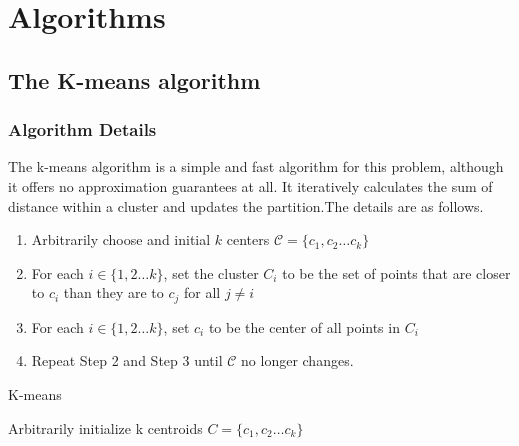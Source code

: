 \documentclass[11pt]{article}
\begin{document}
\section{Algorithms}
\subsection{The K-means algorithm}
\subsubsection{Algorithm Details}
The k-means algorithm is a simple and fast algorithm for this problem, although it offers no approximation guarantees at all.
It iteratively calculates the sum of distance within a cluster and updates the partition.The details are as follows.\cite{k-means}
\begin{enumerate}
  \item Arbitrarily choose and initial $k$ centers $\mathcal{C} = \{c_1, c_2 \dots c_k\}$
  \item For each $i \in \{1, 2 \dots k\}$, set the cluster $C_i$ to be the set of points that are closer to $c_i$ than they are to $c_j$ for all $j \neq i$
  \item For each $i \in \{1, 2 \dots k\}$, set $c_i$ to be the center of all points in $C_i$ 
  \item Repeat Step 2 and Step 3 until $\mathcal{C}$ no longer changes.
\end{enumerate}
\begin{algorithm}
  \caption{K-means}
  \label{k-means}
  \begin{algorithmic}
    \STATE Arbitrarily initialize k centroids $C=\{c_1, c_2 \dots c_k\}$ 
    \REPEAT
      \ENDFOR
      \ENDFOR
      \ENDFOR
      \ENDFOR
  \end{algorithmic}
\end{algorithm}
\end{document}
